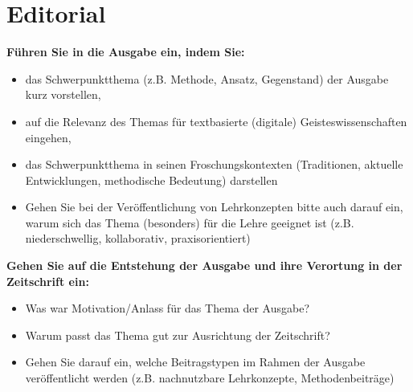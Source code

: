 \documentclass[
          a4paper,
        ]{article}
\begin{document}
\pagestyle{plain}


\maketitle
















\pagestyle{page}

\renewcommand{\arraystretch}{3}  %

\section{Editorial}\label{editorial}

\textbf{Führen Sie in die Ausgabe ein, indem Sie:}

\begin{itemize}
\item
  das Schwerpunktthema (z.B. Methode, Ansatz, Gegenstand) der Ausgabe
  kurz vorstellen,
\item
  auf die Relevanz des Themas für textbasierte (digitale)
  Geisteswissenschaften eingehen,
\item
  das Schwerpunktthema in seinen Froschungskontexten (Traditionen,
  aktuelle Entwicklungen, methodische Bedeutung) darstellen
\item
  Gehen Sie bei der Veröffentlichung von Lehrkonzepten bitte auch darauf
  ein, warum sich das Thema (besonders) für die Lehre geeignet ist (z.B.
  niederschwellig, kollaborativ, praxisorientiert)
\end{itemize}

\textbf{Gehen Sie auf die Entstehung der Ausgabe und ihre Verortung in
der Zeitschrift ein:}

\begin{itemize}
\item
  Was war Motivation/Anlass für das Thema der Ausgabe?
\item
  Warum passt das Thema gut zur Ausrichtung der Zeitschrift?
\item
  Gehen Sie darauf ein, welche Beitragstypen im Rahmen der Ausgabe
  veröffentlicht werden (z.B. nachnutzbare Lehrkonzepte,
  Methodenbeiträge)
\end{itemize}
\end{document}
